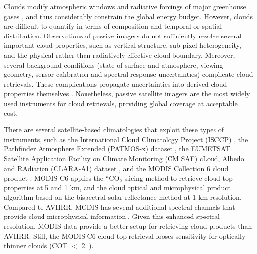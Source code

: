 Clouds modify atmospheric windows and radiative forcings of major greenhouse
gases \citep{Kiehl97}, and thus considerably constrain the global energy
budget. However, clouds are difficult to quantify in terms of composition and
temporal or spatial distribution. Observations of passive imagers do not
sufficiently resolve several important cloud properties, such as
vertical structure, sub-pixel heterogeneity, and the physical rather than radiatively
effective cloud boundary. Moreover, several background conditions (state of
surface and atmosphere, viewing geometry, sensor calibration and spectral
response uncertainties) complicate cloud retrievals. These
complications propagate uncertainties into derived cloud properties
themselves \citep{Hamann14}. Nonetheless, passive satellite imagers are the
most widely used instruments for cloud retrievals, providing global coverage at
acceptable cost. 

There are several satellite-based climatologies that exploit these types of instruments, such as the
International Cloud Climatology Project (ISCCP) \citep{Rossow99}, the
Pathfinder Atmosphere Extended (PATMOS-x) dataset
\citep{Heidinger09,Heidinger12}, the EUMETSAT Satellite Application
Facility on Climate Monitoring (CM SAF) cLoud, Albedo and RAdiation (CLARA-A1)
dataset \citep{Karlsson13}, and the MODIS Collection 6 cloud product \citep{Platnick17}.
MODIS C6 applies the ``CO$_{2}$-slicing method to retrieve cloud top properties at 5 and 1 km, and the cloud optical and microphysical product algorithm based on the bispectral solar reflectance method at 1 km resolution. Compared to AVHRR, MODIS has several additional spectral channels that provide cloud microphysical information \citep{Platnick17}. Given this enhanced spectral resolution, MODIS data provide a better setup for retrieving cloud products than AVHRR. Still, the MODIS C6 cloud top retrieval looses sensitivity for optically thinner clouds (COT $<$ 2, \citet{Menzel10}).

